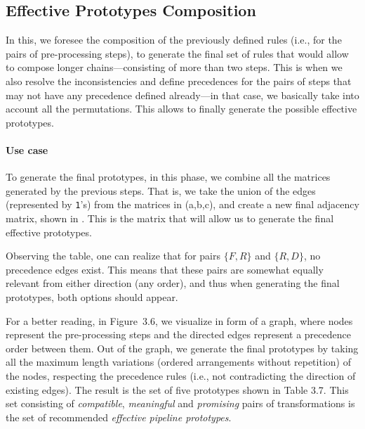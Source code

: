 \subsection{Effective Prototypes Composition}
\label{effective-ssec:composition}
In this, we foresee the composition of the previously defined rules (i.e., for the pairs of pre-processing steps), to generate the final set of rules that would allow to compose longer chains---consisting of more than two steps.
This is when we also resolve the inconsistencies and define precedences for the pairs of steps that may not have any precedence defined already---in that case, we basically take into account all the permutations.
This allows to finally generate the possible effective  prototypes.

\paragraph{Use case}
To generate the final prototypes, in this phase, we combine all the matrices generated by the previous steps.
That is, we take the union of the edges (represented by \texttt{1}'s) from the matrices in  (a,b,c), and create a new final adjacency matrix, shown in .
This is the matrix that will allow us to generate the final effective prototypes.

Observing the table, one can realize that for pairs $\{F,R\}$ and $\{R,D\}$, no precedence edges exist.
This means that these pairs are somewhat equally relevant from either direction (any order), and thus when generating the final prototypes, both options should appear.

For a better reading, in Figure~3.6, we visualize  in form of a graph, where nodes represent the pre-processing steps and the directed edges represent a precedence order between them.
Out of the graph, we generate the final prototypes by taking all the maximum length variations (ordered arrangements without repetition) of the nodes, respecting the precedence rules (i.e., not contradicting the direction of existing edges).
The result is the set of five prototypes shown in Table 3.7. This set consisting of \textit{compatible}, \textit{meaningful} and \textit{promising} pairs of transformations is the set of recommended \textit{effective pipeline prototypes}.



